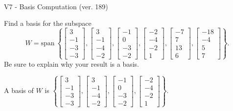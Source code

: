 \begin{exercise}
  \begin{exerciseTitle}V7 - Basis Computation (ver. 189)\end{exerciseTitle}
  \begin{exerciseStatement}
    Find a basis for the subspace 
\[W=\mathrm{span}\ \left\{\left[\begin{array}{r}
3 \\
-1 \\
-3 \\
-3
\end{array}\right] , \left[\begin{array}{r}
3 \\
-1 \\
-4 \\
-2
\end{array}\right] , \left[\begin{array}{r}
-1 \\
0 \\
-3 \\
-2
\end{array}\right] , \left[\begin{array}{r}
-2 \\
-4 \\
-2 \\
1
\end{array}\right] , \left[\begin{array}{r}
-7 \\
7 \\
13 \\
6
\end{array}\right] , \left[\begin{array}{r}
-18 \\
-4 \\
5 \\
7
\end{array}\right]\right\}.\]
 Be sure to explain why your result is a basis.


  \end{exerciseStatement}
  \begin{exerciseAnswer}
   A basis of \(W\) is  \(\left\{\left[\begin{array}{r}
3 \\
-1 \\
-3 \\
-3
\end{array}\right] , \left[\begin{array}{r}
3 \\
-1 \\
-4 \\
-2
\end{array}\right] , \left[\begin{array}{r}
-1 \\
0 \\
-3 \\
-2
\end{array}\right] , \left[\begin{array}{r}
-2 \\
-4 \\
-2 \\
1
\end{array}\right]\right\}\).
  


  \end{exerciseAnswer}
\end{exercise}
